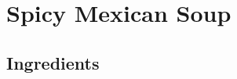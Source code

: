 \thispagestyle{fancy}
\section{Spicy Mexican Soup}
\AddToShipoutPicture*{\MexicanSoup}

\subsection*{Ingredients}